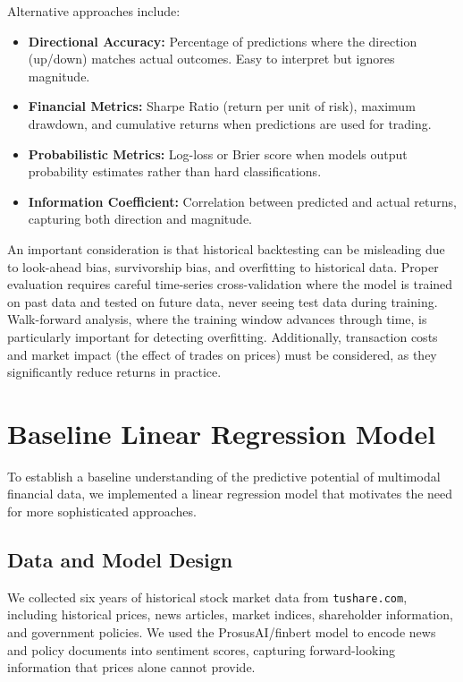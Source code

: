 Alternative approaches include:

\begin{itemize}
    \item \textbf{Directional Accuracy:} Percentage of predictions where the direction (up/down) matches actual outcomes. Easy to interpret but ignores magnitude.
    \item \textbf{Financial Metrics:} Sharpe Ratio (return per unit of risk), maximum drawdown, and cumulative returns when predictions are used for trading.
    \item \textbf{Probabilistic Metrics:} Log-loss or Brier score when models output probability estimates rather than hard classifications.
    \item \textbf{Information Coefficient:} Correlation between predicted and actual returns, capturing both direction and magnitude.
\end{itemize}

An important consideration is that historical backtesting can be misleading due to look-ahead bias, survivorship bias, and overfitting to historical data. Proper evaluation requires careful time-series cross-validation where the model is trained on past data and tested on future data, never seeing test data during training. Walk-forward analysis, where the training window advances through time, is particularly important for detecting overfitting. Additionally, transaction costs and market impact (the effect of trades on prices) must be considered, as they significantly reduce returns in practice.

\section{Baseline Linear Regression Model}

To establish a baseline understanding of the predictive potential of multimodal financial data, we implemented a linear regression model that motivates the need for more sophisticated approaches.

\subsection{Data and Model Design}

We collected six years of historical stock market data from \texttt{tushare.com}, including historical prices, news articles, market indices, shareholder information, and government policies. We used the ProsusAI/finbert model to encode news and policy documents into sentiment scores, capturing forward-looking information that prices alone cannot provide.

